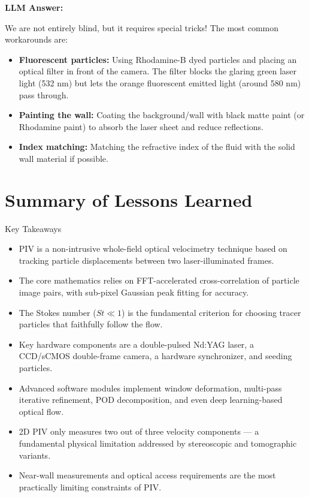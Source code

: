\documentclass[12pt,a4paper]{article}
\begin{document}
\bigskip
\textbf{LLM Answer:}

We are not entirely blind, but it requires special tricks! The most common workarounds are:
\begin{itemize}[noitemsep]
    \item \textbf{Fluorescent particles:} Using Rhodamine-B dyed particles and placing an optical filter in front of the camera. The filter blocks the glaring green laser light (532 nm) but lets the orange fluorescent emitted light (around 580 nm) pass through.
    \item \textbf{Painting the wall:} Coating the background/wall with black matte paint (or Rhodamine paint) to absorb the laser sheet and reduce reflections.
    \item \textbf{Index matching:} Matching the refractive index of the fluid with the solid wall material if possible.
\end{itemize}

\section{Summary of Lessons Learned}

\begin{summarybox}{Key Takeaways}
\begin{itemize}[leftmargin=1.5em]
    \item[\color{accentgreen}\faIcon{check}] PIV is a non-intrusive whole-field optical velocimetry technique based on tracking particle displacements between two laser-illuminated frames.
    \item[\color{accentgreen}\faIcon{check}] The core mathematics relies on FFT-accelerated cross-correlation of particle image pairs, with sub-pixel Gaussian peak fitting for accuracy.
    \item[\color{accentgreen}\faIcon{check}] The Stokes number ($St \ll 1$) is the fundamental criterion for choosing tracer particles that faithfully follow the flow.
    \item[\color{accentgreen}\faIcon{check}] Key hardware components are a double-pulsed Nd:YAG laser, a CCD/sCMOS double-frame camera, a hardware synchronizer, and seeding particles.
    \item[\color{accentgreen}\faIcon{check}] Advanced software modules implement window deformation, multi-pass iterative refinement, POD decomposition, and even deep learning-based optical flow.
    \item[\color{accentgreen}\faIcon{check}] 2D PIV only measures two out of three velocity components --- a fundamental physical limitation addressed by stereoscopic and tomographic variants.
    \item[\color{accentgreen}\faIcon{check}] Near-wall measurements and optical access requirements are the most practically limiting constraints of PIV.
\end{itemize}
\end{summarybox}
\end{document}
